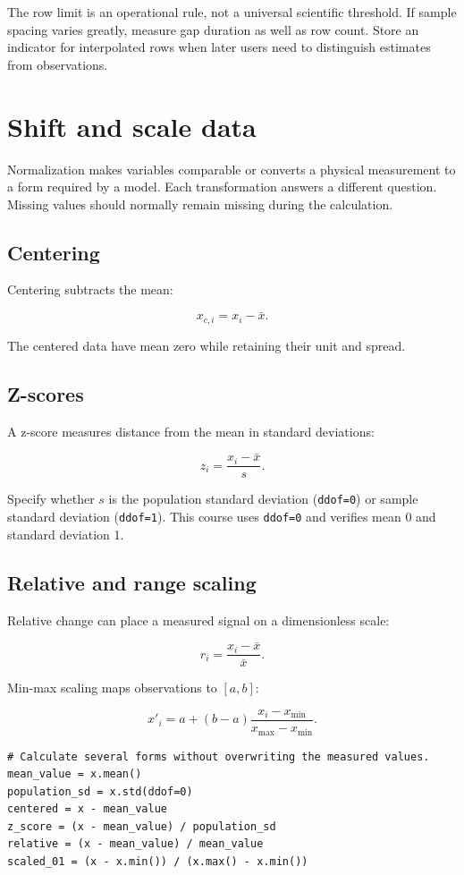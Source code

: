 \documentclass[11pt,letterpaper]{article}
\begin{document}
The row limit is an operational rule, not a universal scientific threshold. If
sample spacing varies greatly, measure gap duration as well as row count. Store
an indicator for interpolated rows when later users need to distinguish estimates
from observations.

\section{Shift and scale data}

Normalization makes variables comparable or converts a physical measurement to
a form required by a model. Each transformation answers a different question.
Missing values should normally remain missing during the calculation.

\subsection{Centering}

Centering subtracts the mean:

\[
  x_{c,i} = x_i - \bar{x}.
\]

The centered data have mean zero while retaining their unit and spread.

\subsection{Z-scores}

A z-score measures distance from the mean in standard deviations:

\[
  z_i = \frac{x_i-\bar{x}}{s}.
\]

Specify whether $s$ is the population standard deviation
(\texttt{ddof=0}) or sample standard deviation (\texttt{ddof=1}). This course
uses \texttt{ddof=0} and verifies mean 0 and standard deviation 1.

\subsection{Relative and range scaling}

Relative change can place a measured signal on a dimensionless scale:

\[
  r_i = \frac{x_i-\bar{x}}{\bar{x}}.
\]

Min-max scaling maps observations to $[a,b]$:

\[
  x'_i = a + (b-a)\frac{x_i-x_{\min}}{x_{\max}-x_{\min}}.
\]

\begin{lstlisting}
# Calculate several forms without overwriting the measured values.
mean_value = x.mean()
population_sd = x.std(ddof=0)
centered = x - mean_value
z_score = (x - mean_value) / population_sd
relative = (x - mean_value) / mean_value
scaled_01 = (x - x.min()) / (x.max() - x.min())
\end{lstlisting}
\end{document}
